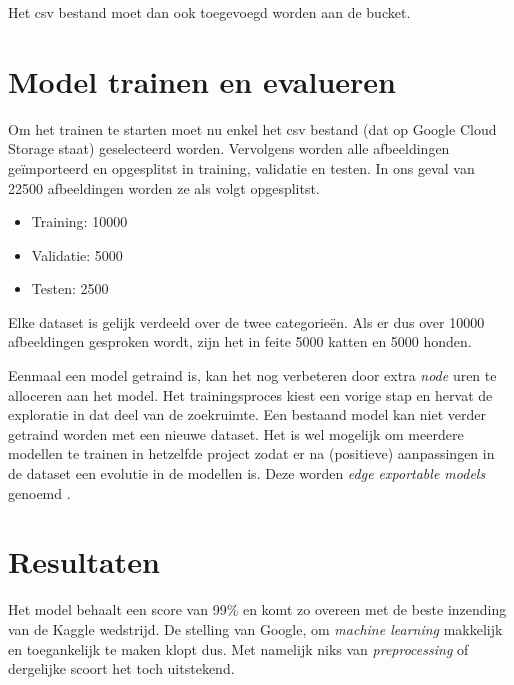 Het csv bestand moet dan ook toegevoegd worden aan de bucket.

\section{Model trainen en evalueren}
\label{sec:google-automl-train}

Om het trainen te starten moet nu enkel het csv bestand (dat op Google Cloud Storage staat) geselecteerd worden. Vervolgens worden alle afbeeldingen geïmporteerd en opgesplitst in training, validatie en testen. In ons geval van 22500 afbeeldingen worden ze als volgt opgesplitst.

\begin{itemize}
    \item Training: 10000
    \item Validatie: 5000
    \item Testen: 2500
\end{itemize}

Elke dataset is gelijk verdeeld over de twee categorieën. Als er dus over 10000 afbeeldingen gesproken wordt, zijn het in feite 5000 katten en 5000 honden.

Eenmaal een model getraind is, kan het nog verbeteren door extra \textit{node} uren te alloceren aan het model. Het trainingsproces kiest een vorige stap en hervat de exploratie in dat deel van de zoekruimte. Een bestaand model kan niet verder getraind worden met een nieuwe dataset. Het is wel mogelijk om meerdere modellen te trainen in hetzelfde project zodat er na (positieve) aanpassingen in de dataset een evolutie in de modellen is. Deze worden \textit{edge exportable models} genoemd \autocite{GoogleEdge2020}.

\section{Resultaten}
\label{sec:google-automl-results}

Het model behaalt een score van 99\% en komt zo overeen met de beste inzending van de Kaggle wedstrijd. De stelling van Google, om \textit{machine learning} makkelijk en toegankelijk te maken klopt dus. Met namelijk niks van \textit{preprocessing} of dergelijke scoort het toch uitstekend.

